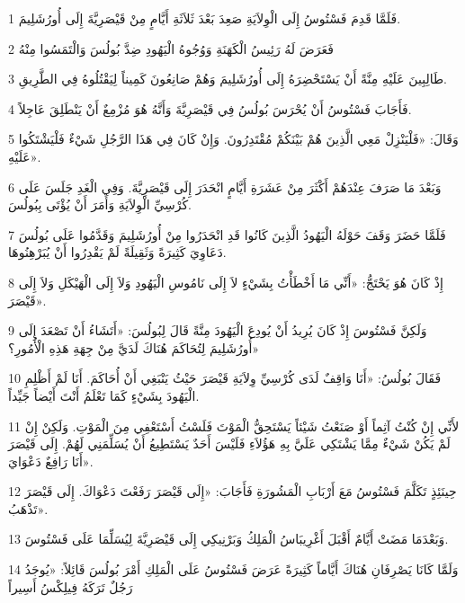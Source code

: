 \par 1 فَلَمَّا قَدِمَ فَسْتُوسُ إِلَى الْوِلاَيَةِ صَعِدَ بَعْدَ ثَلاَثَةِ أَيَّامٍ مِنْ قَيْصَرِيَّةَ إِلَى أُورُشَلِيمَ.
\par 2 فَعَرَضَ لَهُ رَئِيسُ الْكَهَنَةِ وَوُجُوهُ الْيَهُودِ ضِدَّ بُولُسَ وَالْتَمَسُوا مِنْهُ
\par 3 طَالِبِينَ عَلَيْهِ مِنَّةً أَنْ يَسْتَحْضِرَهُ إِلَى أُورُشَلِيمَ وَهُمْ صَانِعُونَ كَمِيناً لِيَقْتُلُوهُ فِي الطَّرِيقِ.
\par 4 فَأَجَابَ فَسْتُوسُ أَنْ يُحْرَسَ بُولُسُ فِي قَيْصَرِيَّةَ وَأَنَّهُ هُوَ مُزْمِعٌ أَنْ يَنْطَلِقَ عَاجِلاً.
\par 5 وَقَالَ: «فَلْيَنْزِلْ مَعِي الَّذِينَ هُمْ بَيْنَكُمْ مُقْتَدِرُونَ. وَإِنْ كَانَ فِي هَذَا الرَّجُلِ شَيْءٌ فَلْيَشْتَكُوا عَلَيْهِ».
\par 6 وَبَعْدَ مَا صَرَفَ عِنْدَهُمْ أَكْثَرَ مِنْ عَشَرَةِ أَيَّامٍ انْحَدَرَ إِلَى قَيْصَرِيَّةَ. وَفِي الْغَدِ جَلَسَ عَلَى كُرْسِيِّ الْوِلاَيَةِ وَأَمَرَ أَنْ يُؤْتَى بِبُولُسَ.
\par 7 فَلَمَّا حَضَرَ وَقَفَ حَوْلَهُ الْيَهُودُ الَّذِينَ كَانُوا قَدِ انْحَدَرُوا مِنْ أُورُشَلِيمَ وَقَدَّمُوا عَلَى بُولُسَ دَعَاوِيَ كَثِيرَةً وَثَقِيلَةً لَمْ يَقْدِرُوا أَنْ يُبَرْهِنُوهَا.
\par 8 إِذْ كَانَ هُوَ يَحْتَجُّ: «أَنِّي مَا أَخْطَأْتُ بِشَيْءٍ لاَ إِلَى نَامُوسِ الْيَهُودِ وَلاَ إِلَى الْهَيْكَلِ وَلاَ إِلَى قَيْصَرَ».
\par 9 وَلَكِنَّ فَسْتُوسَ إِذْ كَانَ يُرِيدُ أَنْ يُودِعَ الْيَهُودَ مِنَّةً قَالَ لِبُولُسَ: «أَتَشَاءُ أَنْ تَصْعَدَ إِلَى أُورُشَلِيمَ لِتُحَاكَمَ هُنَاكَ لَدَيَّ مِنْ جِهَةِ هَذِهِ الْأُمُورِ؟»
\par 10 فَقَالَ بُولُسُ: «أَنَا وَاقِفٌ لَدَى كُرْسِيِّ وِلاَيَةِ قَيْصَرَ حَيْثُ يَنْبَغِي أَنْ أُحَاكَمَ. أَنَا لَمْ أَظْلِمِ الْيَهُودَ بِشَيْءٍ كَمَا تَعْلَمُ أَنْتَ أَيْضاً جَيِّداً.
\par 11 لأَنِّي إِنْ كُنْتُ آثِماً أَوْ صَنَعْتُ شَيْئاً يَسْتَحِقُّ الْمَوْتَ فَلَسْتُ أَسْتَعْفِي مِنَ الْمَوْتِ. وَلَكِنْ إِنْ لَمْ يَكُنْ شَيْءٌ مِمَّا يَشْتَكِي عَلَيَّ بِهِ هَؤُلاَءِ فَلَيْسَ أَحَدٌ يَسْتَطِيعُ أَنْ يُسَلِّمَنِي لَهُمْ. إِلَى قَيْصَرَ أَنَا رَافِعٌ دَعْوَايَ».
\par 12 حِينَئِذٍ تَكَلَّمَ فَسْتُوسُ مَعَ أَرْبَابِ الْمَشُورَةِ فَأَجَابَ: «إِلَى قَيْصَرَ رَفَعْتَ دَعْوَاكَ. إِلَى قَيْصَرَ تَذْهَبُ».
\par 13 وَبَعْدَمَا مَضَتْ أَيَّامٌ أَقْبَلَ أَغْرِيبَاسُ الْمَلِكُ وَبَرْنِيكِي إِلَى قَيْصَرِيَّةَ لِيُسَلِّمَا عَلَى فَسْتُوسَ.
\par 14 وَلَمَّا كَانَا يَصْرِفَانِ هُنَاكَ أَيَّاماً كَثِيرَةً عَرَضَ فَسْتُوسُ عَلَى الْمَلِكِ أَمْرَ بُولُسَ قَائِلاً: «يُوجَدُ رَجُلٌ تَرَكَهُ فِيلِكْسُ أَسِيراً
